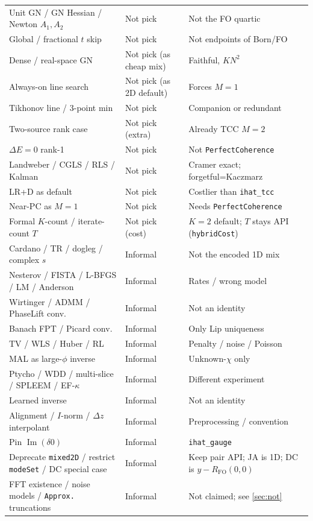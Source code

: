 \documentclass[11pt,a4paper]{article}
\theoremstyle{definition}
\theoremstyle{remark}
\newcommand{\Dz}{\Delta z}
\newcommand{\RFO}{R_{\mathrm{FO}}}
\begin{document}
{\begin{longtable}{@{}p{4.2cm}p{2.0cm}p{7.0cm}@{}}
Unit GN / GN Hessian / Newton $A_1,A_2$ & Not pick & Not the FO quartic \\
Global / fractional $t$ skip & Not pick & Not endpoints of Born/FO \\
Dense / real-space GN & Not pick (as cheap mix) & Faithful, $KN^2$ \\
Always-on line search & Not pick (as 2D default) & Forces $M=1$ \\
Tikhonov line / 3-point min & Not pick & Companion or redundant \\
Two-source rank case & Not pick (extra) & Already TCC $M=2$ \\
$\Delta E=0$ rank-1 & Not pick & Not \texttt{PerfectCoherence} \\
Landweber / CGLS / RLS / Kalman & Not pick & Cramer exact; forgetful=Kaczmarz \\
LR+D as default & Not pick & Costlier than \texttt{ihat\_tcc} \\
Near-PC as $M=1$ & Not pick & Needs \texttt{PerfectCoherence} \\
Formal $K$-count / iterate-count $T$ & Not pick (cost) & $K=2$ default; $T$ stays API (\texttt{hybridCost}) \\
Cardano / TR / dogleg / complex $s$ & Informal & Not the encoded 1D mix \\
Nesterov / FISTA / L-BFGS / LM / Anderson & Informal & Rates / wrong model \\
Wirtinger / ADMM / PhaseLift conv. & Informal & Not an identity \\
Banach FPT / Picard conv. & Informal & Only Lip uniqueness \\
TV / WLS / Huber / RL & Informal & Penalty / noise / Poisson \\
MAL as large-$\phi$ inverse & Informal & Unknown-$\chi$ only \\
Ptycho / WDD / multi-slice / SPLEEM / EF-$\kappa$ & Informal & Different experiment \\
Learned inverse & Informal & Not an identity \\
Alignment / $I$-norm / $\Dz$ interpolant & Informal & Preprocessing / convention \\
Pin $\operatorname{Im}(\delta 0)$ & Informal & \texttt{ihat\_gauge} \\
Deprecate \texttt{mixed2D} / restrict \texttt{modeSet} / DC special case & Informal & Keep pair API; JA is 1D; DC is $y{-}\RFO(0,0)$ \\
FFT existence / noise models / \texttt{Approx.} truncations & Informal & Not claimed; see \cref{sec:not} \\
\end{longtable}
}
\end{document}
